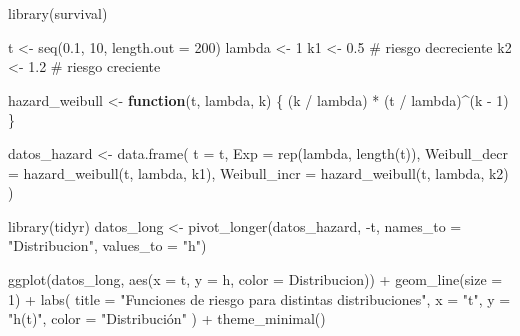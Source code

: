 \documentclass[
  letterpaper,
  ignorenonframetext,
  DIV=11,
  numbers=noendperiod]{scrartcl}
\newenvironment{Shaded}{\begin{snugshade}}{\end{snugshade}}
\newcommand{\AttributeTok}[1]{\textcolor[rgb]{0.40,0.45,0.13}{#1}}
\newcommand{\CommentTok}[1]{\textcolor[rgb]{0.37,0.37,0.37}{#1}}
\newcommand{\ControlFlowTok}[1]{\textcolor[rgb]{0.00,0.23,0.31}{\textbf{#1}}}
\newcommand{\DecValTok}[1]{\textcolor[rgb]{0.68,0.00,0.00}{#1}}
\newcommand{\FloatTok}[1]{\textcolor[rgb]{0.68,0.00,0.00}{#1}}
\newcommand{\FunctionTok}[1]{\textcolor[rgb]{0.28,0.35,0.67}{#1}}
\newcommand{\NormalTok}[1]{\textcolor[rgb]{0.00,0.23,0.31}{#1}}
\newcommand{\OtherTok}[1]{\textcolor[rgb]{0.00,0.23,0.31}{#1}}
\newcommand{\SpecialCharTok}[1]{\textcolor[rgb]{0.37,0.37,0.37}{#1}}
\newcommand{\StringTok}[1]{\textcolor[rgb]{0.13,0.47,0.30}{#1}}
\begin{document}
\begin{Shaded}
\begin{Highlighting}[]
\FunctionTok{library}\NormalTok{(survival)}

\NormalTok{t }\OtherTok{\textless{}{-}} \FunctionTok{seq}\NormalTok{(}\FloatTok{0.1}\NormalTok{, }\DecValTok{10}\NormalTok{, }\AttributeTok{length.out =} \DecValTok{200}\NormalTok{)}
\NormalTok{lambda }\OtherTok{\textless{}{-}} \DecValTok{1}
\NormalTok{k1 }\OtherTok{\textless{}{-}} \FloatTok{0.5}  \CommentTok{\# riesgo decreciente}
\NormalTok{k2 }\OtherTok{\textless{}{-}} \FloatTok{1.2}    \CommentTok{\# riesgo creciente}

\NormalTok{hazard\_weibull }\OtherTok{\textless{}{-}} \ControlFlowTok{function}\NormalTok{(t, lambda, k) \{}
\NormalTok{  (k }\SpecialCharTok{/}\NormalTok{ lambda) }\SpecialCharTok{*}\NormalTok{ (t }\SpecialCharTok{/}\NormalTok{ lambda)}\SpecialCharTok{\^{}}\NormalTok{(k }\SpecialCharTok{{-}} \DecValTok{1}\NormalTok{)}
\NormalTok{\}}

\NormalTok{datos\_hazard }\OtherTok{\textless{}{-}} \FunctionTok{data.frame}\NormalTok{(}
  \AttributeTok{t =}\NormalTok{ t,}
  \AttributeTok{Exp =} \FunctionTok{rep}\NormalTok{(lambda, }\FunctionTok{length}\NormalTok{(t)),}
  \AttributeTok{Weibull\_decr =} \FunctionTok{hazard\_weibull}\NormalTok{(t, lambda, k1),}
  \AttributeTok{Weibull\_incr =} \FunctionTok{hazard\_weibull}\NormalTok{(t, lambda, k2)}
\NormalTok{)}

\FunctionTok{library}\NormalTok{(tidyr)}
\NormalTok{datos\_long }\OtherTok{\textless{}{-}} \FunctionTok{pivot\_longer}\NormalTok{(datos\_hazard, }\SpecialCharTok{{-}}\NormalTok{t, }\AttributeTok{names\_to =} \StringTok{"Distribucion"}\NormalTok{, }\AttributeTok{values\_to =} \StringTok{"h"}\NormalTok{)}

\FunctionTok{ggplot}\NormalTok{(datos\_long, }\FunctionTok{aes}\NormalTok{(}\AttributeTok{x =}\NormalTok{ t, }\AttributeTok{y =}\NormalTok{ h, }\AttributeTok{color =}\NormalTok{ Distribucion)) }\SpecialCharTok{+}
  \FunctionTok{geom\_line}\NormalTok{(}\AttributeTok{size =} \DecValTok{1}\NormalTok{) }\SpecialCharTok{+}
  \FunctionTok{labs}\NormalTok{(}
    \AttributeTok{title =} \StringTok{"Funciones de riesgo para distintas distribuciones"}\NormalTok{,}
    \AttributeTok{x =} \StringTok{"t"}\NormalTok{,}
    \AttributeTok{y =} \StringTok{"h(t)"}\NormalTok{,}
    \AttributeTok{color =} \StringTok{"Distribución"}
\NormalTok{  ) }\SpecialCharTok{+}
  \FunctionTok{theme\_minimal}\NormalTok{()}
\end{Highlighting}
\end{Shaded}
\end{document}
